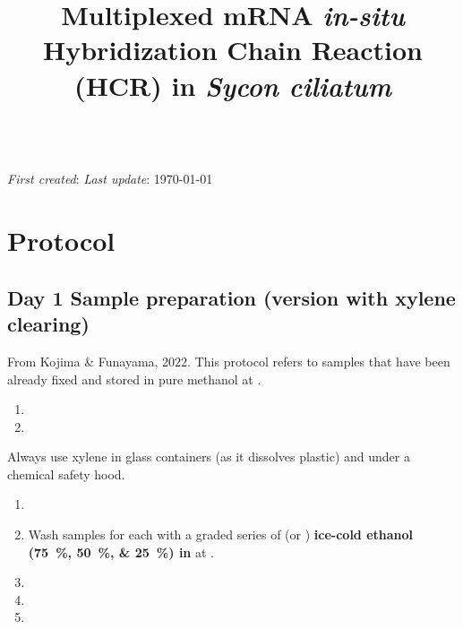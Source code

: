\documentclass[10pt]{report}
\makeatletter
\renewcommand\maketitle{
{\begin{center}
{\Large \bfseries \@title }\\
{\small \emph{First created}: \DTMdisplaydate{2024}{12}{5}{-1}\hfill%
\setstretch{1.0} \small \hfill \emph{Last update}: \today}
\end{center}}} %
\makeatother
\begin{document}

\title{\vspace{-3em} Multiplexed mRNA \textit{in-situ} Hybridization Chain Reaction (HCR) in \emph{Sycon ciliatum}}
\maketitle
\thispagestyle{plain}

\section*{\vspace{-1em} \textendash{} Protocol \textendash{}}

\subsection*{Day 1 \textendash{} Sample preparation (version with xylene clearing)}

\alert{From Kojima \& Funayama, 2022.}
\alert{This protocol refers to samples that have been already fixed and stored in pure methanol at \minustwenty.}

\begin{enumerate}[series = steps]
	\item {}
	\item {}
\end{enumerate}

\bigskip\alert{Always use xylene in glass containers (as it dissolves plastic) and under a chemical safety hood.}

\begin{enumerate}[resume = steps]
	\item {}
	\item Wash samples for \underline{\quarter} each with a graded series of \fivehunmicrol{} (or \onemil) \textbf{ice-cold ethanol (\qtylist{75;50;25}{\percent}) in \hs{}} at \fourdegree.
	\item {}
	\item {}
	\item {}
\end{enumerate}
\end{document}
